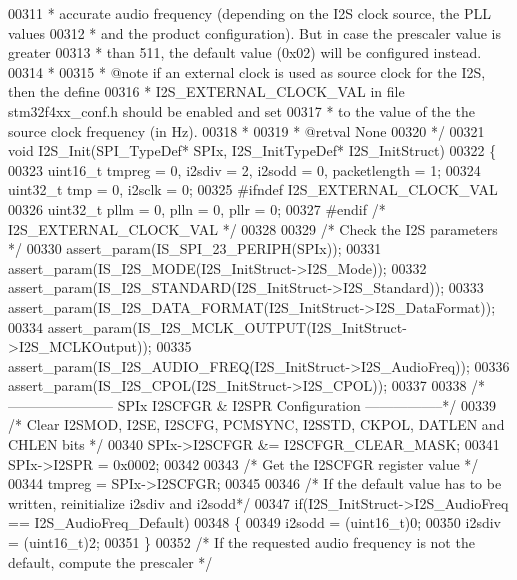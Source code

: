 \begin{DoxyCode}
00311 \textcolor{comment}{  *         accurate audio frequency (depending on the I2S clock source, the PLL values }
00312 \textcolor{comment}{  *         and the product configuration). But in case the prescaler value is greater }
00313 \textcolor{comment}{  *         than 511, the default value (0x02) will be configured instead.    }
00314 \textcolor{comment}{  * }
00315 \textcolor{comment}{  * @note   if an external clock is used as source clock for the I2S, then the define}
00316 \textcolor{comment}{  *         I2S\_EXTERNAL\_CLOCK\_VAL in file stm32f4xx\_conf.h should be enabled and set}
00317 \textcolor{comment}{  *         to the value of the the source clock frequency (in Hz).}
00318 \textcolor{comment}{  *  }
00319 \textcolor{comment}{  * @retval None}
00320 \textcolor{comment}{  */}
00321 \textcolor{keywordtype}{void} I2S_Init(SPI\_TypeDef* SPIx, I2S\_InitTypeDef* I2S\_InitStruct)
00322 \{
00323   uint16\_t tmpreg = 0, i2sdiv = 2, i2sodd = 0, packetlength = 1;
00324   uint32\_t tmp = 0, i2sclk = 0;
00325 \textcolor{preprocessor}{#}\textcolor{preprocessor}{ifndef} \textcolor{preprocessor}{I2S\_EXTERNAL\_CLOCK\_VAL}
00326   uint32\_t pllm = 0, plln = 0, pllr = 0;
00327 \textcolor{preprocessor}{#}\textcolor{preprocessor}{endif} \textcolor{comment}{/* I2S\_EXTERNAL\_CLOCK\_VAL */}
00328 
00329   \textcolor{comment}{/* Check the I2S parameters */}
00330   assert_param(IS\_SPI\_23\_PERIPH(SPIx));
00331   assert_param(IS\_I2S\_MODE(I2S\_InitStruct->I2S\_Mode));
00332   assert_param(IS\_I2S\_STANDARD(I2S\_InitStruct->I2S\_Standard));
00333   assert_param(IS\_I2S\_DATA\_FORMAT(I2S\_InitStruct->I2S\_DataFormat));
00334   assert_param(IS\_I2S\_MCLK\_OUTPUT(I2S\_InitStruct->I2S\_MCLKOutput));
00335   assert_param(IS\_I2S\_AUDIO\_FREQ(I2S\_InitStruct->I2S\_AudioFreq));
00336   assert_param(IS\_I2S\_CPOL(I2S\_InitStruct->I2S\_CPOL));
00337 
00338 \textcolor{comment}{/*----------------------- SPIx I2SCFGR & I2SPR Configuration -----------------*/}
00339   \textcolor{comment}{/* Clear I2SMOD, I2SE, I2SCFG, PCMSYNC, I2SSTD, CKPOL, DATLEN and CHLEN bits */}
00340   SPIx->I2SCFGR &= I2SCFGR_CLEAR_MASK;
00341   SPIx->I2SPR = 0x0002;
00342 
00343   \textcolor{comment}{/* Get the I2SCFGR register value */}
00344   tmpreg = SPIx->I2SCFGR;
00345 
00346   \textcolor{comment}{/* If the default value has to be written, reinitialize i2sdiv and i2sodd*/}
00347   \textcolor{keywordflow}{if}(I2S\_InitStruct->I2S_AudioFreq == I2S_AudioFreq_Default)
00348   \{
00349     i2sodd = (uint16\_t)0;
00350     i2sdiv = (uint16\_t)2;
00351   \}
00352   \textcolor{comment}{/* If the requested audio frequency is not the default, compute the prescaler */}

\end{DoxyCode}
